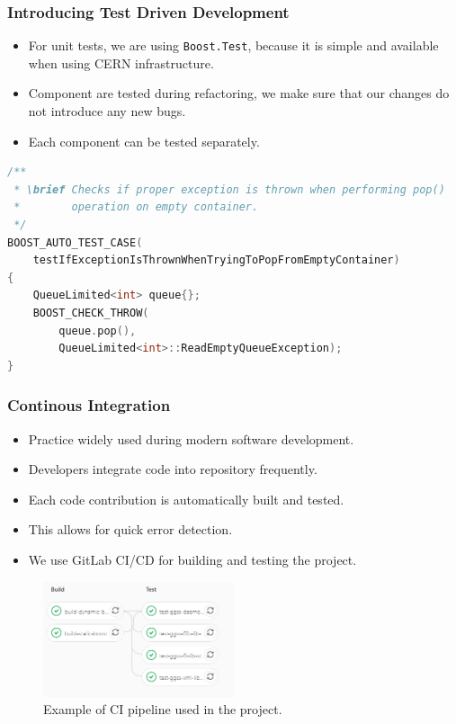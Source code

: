 \documentclass[10pt]{beamer}
\begin{document}
\begin{frame}[fragile]
\frametitle{Introducing Test Driven Development}
\begin{itemize}
\item For unit tests, we are using \lstinline[basicstyle=\ttfamily\normalsize]{Boost.Test}, because it is simple and available when using CERN infrastructure.
\item Component are tested during refactoring, we make sure that our changes do not introduce any new bugs.
\item Each component can be tested separately.
\end{itemize}
\begin{lstlisting}[language=c++, caption={Unit test example}]
/**
 * \brief Checks if proper exception is thrown when performing pop() 
 *        operation on empty container.
 */
BOOST_AUTO_TEST_CASE(
    testIfExceptionIsThrownWhenTryingToPopFromEmptyContainer)
{
    QueueLimited<int> queue{};
    BOOST_CHECK_THROW(
        queue.pop(), 
        QueueLimited<int>::ReadEmptyQueueException);
}   
\end{lstlisting}
\end{frame}

\begin{frame}[fragile]
\frametitle{Continous Integration}
\begin{itemize}
\item Practice widely used during modern software development.
\item Developers integrate code into repository frequently.
\item Each code contribution is automatically built and tested.
\item This allows for quick error detection.
\item We use GitLab CI/CD for building and testing the project.
\end{itemize}
\begin{figure}
\centering
\includegraphics[width=0.5\textwidth]{resources/pipeline_example.png}
\caption{Example of CI pipeline used in the project.}
\end{figure}
\end{frame}
\end{document}
